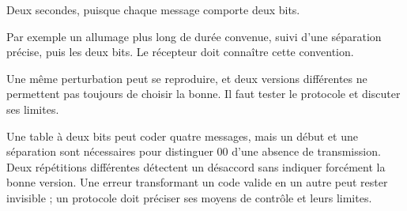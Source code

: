 \par\noindent\begin{minipage}{\linewidth}
\label{cor-defi-18}\begin{questions}
\item Deux secondes, puisque chaque message comporte deux bits.
\item Par exemple un allumage plus long de durée convenue, suivi d’une séparation précise, puis les deux bits. Le récepteur doit connaître cette convention.
\item Une même perturbation peut se reproduire, et deux versions différentes ne permettent pas toujours de choisir la bonne. Il faut tester le protocole et discuter ses limites.
\end{questions}
\end{minipage}
\par\noindent\begin{minipage}{\linewidth}
\label{cor-activite-18}
Une table à deux bits peut coder quatre messages, mais un début et une séparation sont nécessaires pour distinguer 00 d’une absence de transmission. Deux répétitions différentes détectent un désaccord sans indiquer forcément la bonne version. Une erreur transformant un code valide en un autre peut rester invisible ; un protocole doit préciser ses moyens de contrôle et leurs limites.\par\end{minipage}
